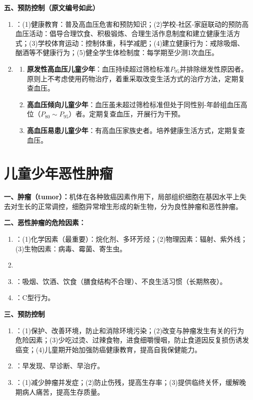 \begin{keybox}
\textbf{五、预防控制（原文编号如此）}
\begin{enumerate}[leftmargin=*]
    \item {}：(1)健康教育：普及高血压危害和预防知识；(2)学校-社区-家庭联动的预防高血压活动：倡导合理饮食、积极锻炼、合理生活作息制度和建立健康生活方式；(3)学校体育运动：控制体重，科学减肥；(4)建立健康行为：戒除吸烟、酗酒等不健康行为；(5)健全学生体检制度：每学期至少测1次血压。
    \item {}
    \begin{enumerate}
        \item \textbf{原发性高血压儿童少年}：血压持续超过筛检标准$P_{95}$并排除继发性原因者。原则上不考虑使用药物治疗，着重采取改变生活方式的治疗方法，定期复查血压。
        \item \textbf{高血压倾向儿童少年}：血压虽未超过筛检标准但处于同性别-年龄组血压高位（$P_{80}\sim P_{95}$）者。定期复查血压，开展行为干预。
        \item \textbf{高血压易患儿童少年}：有高血压家族史者。培养健康生活方式，定期复查血压。
    \end{enumerate}
\end{enumerate}
\end{keybox}

\section{儿童少年恶性肿瘤}

\begin{keybox}
\textbf{一、肿瘤（tumor）：}机体在各种致癌因素作用下，局部组织细胞在基因水平上失去对生长的正常调控，细胞异常增生形成的新生物，分为良性肿瘤和恶性肿瘤。

\textbf{二、恶性肿瘤的危险因素：}
\begin{enumerate}[leftmargin=*]
    \item {}：(1)化学因素（最重要）：烷化剂、多环芳烃；(2)物理因素：辐射、紫外线；(3)生物因素：病毒、霉菌、寄生虫。
    \item {}
    \item {}：吸烟、饮酒、饮食（膳食结构不合理）、不良生活习惯（长期熬夜）。
    \item {}：C型行为。
\end{enumerate}

\textbf{三、预防控制}
\begin{enumerate}[leftmargin=*]
    \item {}：(1)保护、改善环境，防止和消除环境污染；(2)改变与肿瘤发生有关的行为危险因素；(3)少吃过烫、过辣食物，进食细嚼慢咽，防止食道因反复损伤诱发癌变；(4)儿童期开始加强防癌健康教育，提高自我保健能力。
    \item {}：早发现、早诊断、早治疗。
    \item {}：(1)减少肿瘤并发症；(2)防止伤残，提高生存率；(3)提供临终关怀，缓解晚期病人痛苦，提高生存质量。
\end{enumerate}
\end{keybox}

